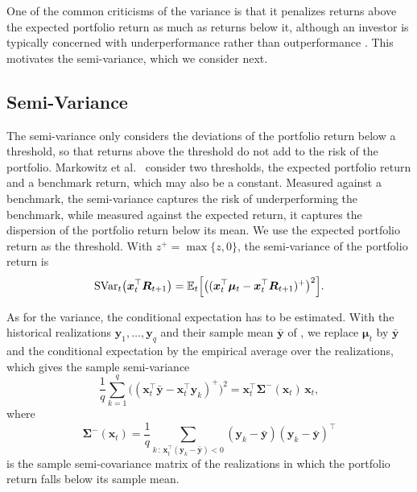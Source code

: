 One of the common criticisms of the variance is that it penalizes returns above the expected portfolio return as much as returns below it, although an
investor is typically concerned with underperformance rather than outperformance \cite{Markowitz1993}. This motivates
the semi-variance, which we consider next. 

\subsection{Semi-Variance}\label{sec:risk-semi-variance}

The semi-variance only considers the deviations of the portfolio return
below a threshold, so that returns above the threshold do not add to the risk of the portfolio. Markowitz et
al.~\cite{Markowitz1993} consider two thresholds, the expected portfolio return and a benchmark return, which may also be
a constant. Measured against a benchmark, the semi-variance captures the risk of underperforming the benchmark, while
measured against the expected return, it captures the dispersion of the portfolio return below its mean. We use the
expected portfolio return as the threshold. With $z^+ = \max\{z, 0\}$, the semi-variance of the portfolio return is
\begin{equation*}
    \text{SVar}_t\bigl( \bm{x}_t^\top \bm{R}_{t+1} \bigr)
    = \mathbb{E}_t\Bigl[ \bigl( (\bm{x}_t^\top \bm{\mu}_t - \bm{x}_t^\top \bm{R}_{t+1})^+ \bigr)^2 \Bigr].
\end{equation*}

As for the variance, the
conditional expectation has to be estimated. With the historical realizations $\bm{y}_1, \dots, \bm{y}_q$ and their
sample mean $\bar{\bm{y}}$ of , we replace $\bm{\mu}_t$ by $\bar{\bm{y}}$ and the conditional
expectation by the empirical average over the realizations, which gives the sample semi-variance
\begin{equation}\label{eq:sample-semi-variance}
    \frac{1}{q} \sum_{k=1}^q \bigl( (\bm{x}_t^\top \bar{\bm{y}} - \bm{x}_t^\top \bm{y}_k)^+ \bigr)^2
    = \bm{x}_t^\top \bm{\Sigma}^-(\bm{x}_t)\, \bm{x}_t,
\end{equation}
where
\begin{equation*}
    \bm{\Sigma}^-(\bm{x}_t) = \frac{1}{q} \sum_{k \,:\, \bm{x}_t^\top (\bm{y}_k - \bar{\bm{y}}) < 0}
    (\bm{y}_k - \bar{\bm{y}})(\bm{y}_k - \bar{\bm{y}})^\top
\end{equation*}
is the sample semi-covariance matrix of the realizations in which the portfolio return falls below its sample mean.

